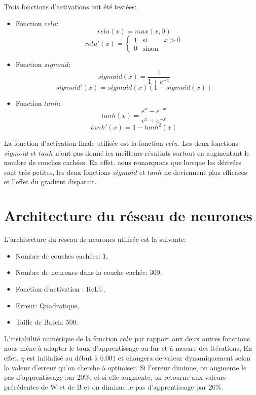 \documentclass[a4paper,english,12pt]{article}
\begin{document}
Trois fonctions d'activations ont été testées:

\begin{itemize}
	\item Fonction $relu$:	
		$$relu(x)=max(x,0)$$		
		\begin{equation}
		relu'(x) = \left\{ \begin{array}{rcl}
		{1} & \mbox{si}
		& x>0 \\ 0 & \mbox{sinon}
		\end{array}\right.\label{eq2}
		\end{equation}
	\item Fonction $sigmoid$:
		$$ sigmoid(x) = \frac{1}{1 + e^{-x}}$$
		$$sigmoid'(x)=sigmoid(x)(1-sigmoid(x))$$
	\item  Fonction $tanh$:	
		$$ tanh(x) = \frac{e^{x} - e^{-x}}{e^{x} + e^{-x}}$$
		$$ tanh'(x)=1-tanh^2(x)$$
\end{itemize}

La fonction d'activation finale utilisée est la fonction $relu$. Les deux fonctions $sigmoid$ et $tanh$ n'ont pas donné les meilleurs résultats surtout en augmentant le nombre de couches cachées. En effet, nous remarquons que lorsque les dérivées sont très petites, les deux fonctions $sigmoid$ et $tanh$ ne deviennent plus efficaces et l'effet du gradient disparait. 

\section{Architecture du réseau de neurones}
L'architecture du réseau de neurones utilisée est la suivante: 
\begin{itemize}
	\item Nombre de couches cachées: 1,
	\item Nombre de neurones dans la couche cachée: 300,
	\item Fonction d'activation : ReLU,
	\item Erreur: Quadratique,
	\item Taille de Batch: 500.
\end{itemize}

L'instabilité numérique de la fonction $relu$ par rapport aux deux autres fonctions nous mène à adapter le taux d'apprentissage au fur et à mesure des itérations, En effet, $\eta$ est initialisé au début à 0.001 et  changera de valeur dynamiquement selon la valeur d'erreur qu'on cherche à optimiser. Si l'erreur diminue, on augmente le pas d'apprentissage par 20\%, et si elle augmente, on retourne aux valeurs précédentes de W et de B et on diminue le pas d'apprentissage par 20\%.
\end{document}
